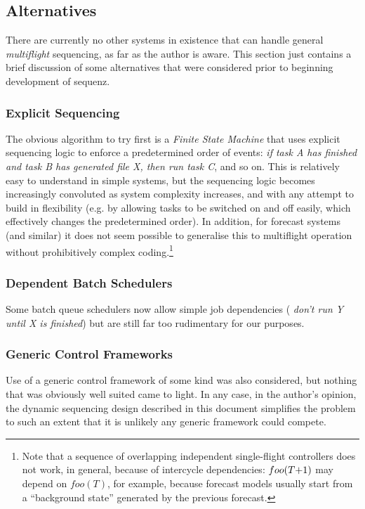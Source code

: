 \documentclass[11pt,a4paper]{article}
\begin{document}
\subsection{Alternatives}

There are currently no other systems in existence that can handle
general {\em multiflight} sequencing, as far as the author is aware.
This section just contains a brief discussion of some alternatives that
were considered prior to beginning development of sequenz.

\subsubsection{Explicit Sequencing}

The obvious algorithm to try first is a {\em Finite State Machine} that
uses explicit sequencing logic to enforce a predetermined order of
events: {\em if task A has finished and task B has generated file X,
then run task C}, and so on. This is relatively easy to understand in
simple systems, but the sequencing logic becomes increasingly convoluted
as system complexity increases, and with any attempt to build in
flexibility (e.g. by allowing tasks to be switched on and off easily,
which effectively changes the predetermined order). In addition, for
forecast systems (and similar) it does not seem possible to generalise
this to multiflight operation without prohibitively complex
coding.\footnote{Note that a sequence of overlapping independent
single-flight controllers does not work, in general, because of
intercycle dependencies: $foo(T\negmedspace +\negmedspace 1)$ may depend
on $foo(T)$, for example, because forecast models usually start from a
``background state'' generated by the previous forecast.} 


\subsubsection{Dependent Batch Schedulers}

Some batch queue schedulers now allow simple job dependencies ({\em
don't run Y until X is finished}) but are still far too rudimentary for
our purposes. 


\subsubsection{Generic Control Frameworks}

Use of a generic control framework of some kind was also
considered, but nothing that was obviously well suited came to light. In
any case, in the author's opinion, the dynamic sequencing design
described in this document simplifies the problem to such an extent that
it is unlikely any generic framework could compete.  
\end{document}
